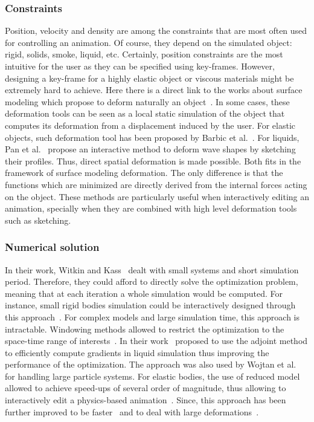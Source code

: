 \subsubsection{Constraints}
Position, velocity and density are among the constraints that are most often used for controlling an animation. 
Of course, they depend on the simulated object: rigid, solids, smoke, liquid, etc. 
Certainly, position constraints are the most intuitive for the user as they can be specified using key-frames. 
However, designing a key-frame for a highly elastic object or viscous materials might be extremely hard to achieve. 
Here there is a direct link to the works about surface modeling which propose to deform naturally an object~\cite{Sorkine2007, Hildebrandt2011}. 
In some cases, these deformation tools can be seen as a local static simulation of the object that computes its deformation from a displacement induced by the user. 
For elastic objects, such deformation tool has been proposed by Barbic et al.~\cite{Barbic2012}.
For liquids, Pan et al.~\cite{Pan2013} propose an interactive method to deform wave shapes by sketching their profiles. 
Thus, direct spatial deformation is made possible. 
Both fits in the framework of surface modeling deformation. 
The only difference is that the functions which are minimized are directly derived from the internal forces acting on the object. 
These methods are particularly useful when interactively editing an animation, specially when they are combined with high level deformation tools such as sketching.

\subsubsection{Numerical solution}
In their work, Witkin and Kass~\cite{Witkin1988} dealt with small systems and short simulation period.
Therefore, they could afford to directly solve the optimization problem, meaning that at each iteration a whole simulation would be computed. For instance, small rigid bodies simulation could be interactively designed through this approach~\cite{Popovic2000,Popovic2003}. For complex models and large simulation time, this approach is intractable. Windowing methods allowed to restrict the optimization to the space-time range of interests~\cite{Cohen1992}. In their work~\cite{McNamara2004} proposed to use the adjoint method to efficiently compute gradients in liquid simulation thus improving the performance of the optimization. The approach was also used by Wojtan et al.~\cite{wojtan2006keyframe} for handling large particle systems. For elastic bodies, the use of reduced model allowed to achieve speed-ups of several order of magnitude, thus allowing to interactively edit a physics-based animation~\cite{Barbic2012,Hildebrandt2012,Hahn2012}. Since, this approach has been further improved to be faster~\cite{Schulz2014} and to deal with large deformations~\cite{Li2014}.

